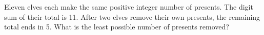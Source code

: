 Eleven elves each make the same positive integer number of presents. The digit sum of their total is 11. After two elves remove their own presents, the remaining total ends in 5. What is the least possible number of presents removed?
